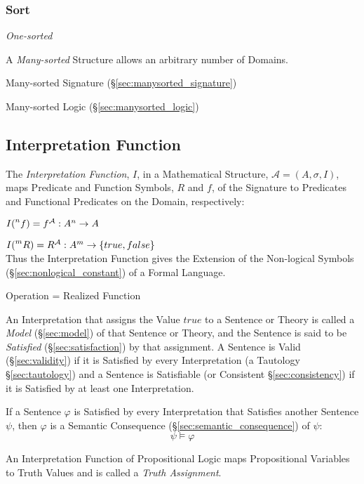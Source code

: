 \subsubsection{Sort}\label{sec:sort}

\emph{One-sorted}

A \emph{Many-sorted} Structure allows an arbitrary number of Domains.

Many-sorted Signature (\S\ref{sec:manysorted_signature})

Many-sorted Logic (\S\ref{sec:manysorted_logic})



\subsection{Interpretation Function}
\label{sec:interpretation_function}

The \emph{Interpretation Function}, $I$, in a Mathematical Structure,
$\mathcal{A} = (A, \sigma, I)$, maps Predicate and Function Symbols,
$R$ and $f$, of the Signature to Predicates and Functional Predicates
on the Domain, respectively:

$I (\prescript{n}{}{f}) = f^{\mathcal{A}} : A^n \rightarrow A$

$I (\prescript{m}{}{R}) = R^{\mathcal{A}} : A^m \rightarrow \{true,
false\}$ \\
Thus the Interpretation Function gives the Extension of
the Non-logical Symbols (\S\ref{sec:nonlogical_constant}) of a Formal
Language.

Operation = Realized Function

An Interpretation that assigns the Value $true$ to a Sentence or
Theory is called a \emph{Model} (\S\ref{sec:model}) of that Sentence
or Theory, and the Sentence is said to be \emph{Satisfied}
(\S\ref{sec:satisfaction}) by that assignment. A Sentence is Valid
(\S\ref{sec:validity}) if it is Satisfied by every Interpretation (a
Tautology \S\ref{sec:tautology}) and a Sentence is Satisfiable (or
Consistent \S\ref{sec:consistency}) if it is Satisfied by at least one
Interpretation.

If a Sentence $\varphi$ is Satisfied by every Interpretation that
Satisfies another Sentence $\psi$, then $\varphi$ is a Semantic
Consequence (\S\ref{sec:semantic_consequence}) of $\psi$:
\[
  \psi \vDash \varphi
\]

An Interpretation Function of Propositional Logic maps Propositional
Variables to Truth Values and is called a \emph{Truth Assignment}.

